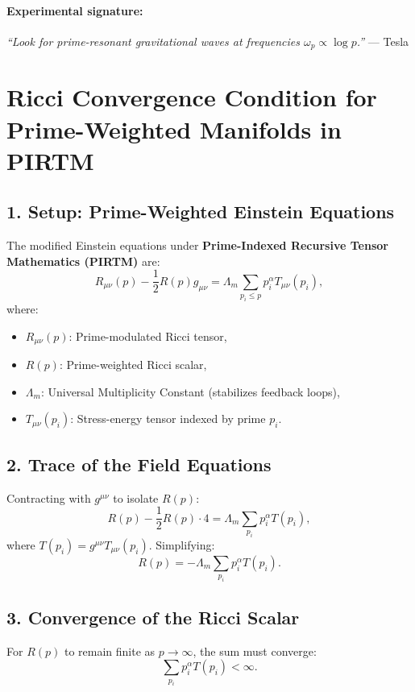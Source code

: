 \documentclass[12pt]{article}
\theoremstyle{plain}
\begin{document}
\paragraph*{Experimental signature:}
\emph{``Look for prime-resonant gravitational waves at frequencies \( \omega_p \propto \log p \).''} — Tesla


\section{Ricci Convergence Condition for Prime-Weighted Manifolds in PIRTM}

\subsection*{1. Setup: Prime-Weighted Einstein Equations}

The modified Einstein equations under \textbf{Prime-Indexed Recursive Tensor Mathematics (PIRTM)} are:
\[
R_{\mu\nu}(p) - \frac{1}{2} R(p) g_{\mu\nu} = \Lambda_m \sum_{p_i \leq p} p_i^\alpha T_{\mu\nu}(p_i),
\]
where:
\begin{itemize}
    \item \( R_{\mu\nu}(p) \): Prime-modulated Ricci tensor,
    \item \( R(p) \): Prime-weighted Ricci scalar,
    \item \( \Lambda_m \): Universal Multiplicity Constant (stabilizes feedback loops),
    \item \( T_{\mu\nu}(p_i) \): Stress-energy tensor indexed by prime \( p_i \).
\end{itemize}

\subsection*{2. Trace of the Field Equations}

Contracting with \( g^{\mu\nu} \) to isolate \( R(p) \):
\[
R(p) - \frac{1}{2} R(p) \cdot 4 = \Lambda_m \sum_{p_i} p_i^\alpha T(p_i),
\]
where \( T(p_i) = g^{\mu\nu} T_{\mu\nu}(p_i) \). Simplifying:
\[
R(p) = -\Lambda_m \sum_{p_i} p_i^\alpha T(p_i).
\]

\subsection*{3. Convergence of the Ricci Scalar}

For \( R(p) \) to remain finite as \( p \to \infty \), the sum must converge:
\[
\sum_{p_i} p_i^\alpha T(p_i) < \infty.
\]
\end{document}
